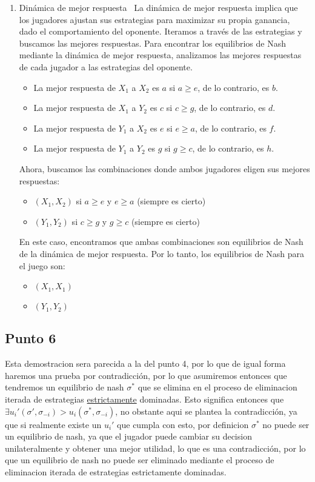 \documentclass[11pt]{article}
\begin{document}
\begin{enumerate}
    \item Dinámica de mejor respuesta \
    La dinámica de mejor respuesta implica que los jugadores ajustan sus estrategias para maximizar su propia ganancia, dado el comportamiento del oponente. Iteramos a través de las estrategias y buscamos las mejores respuestas.
    Para encontrar los equilibrios de Nash mediante la dinámica de mejor respuesta, analizamos las mejores respuestas de cada jugador a las estrategias del oponente.
    \begin{itemize}
    \item La mejor respuesta de $X_1$ a $X_2$ es $a$ si $a \geq e$, de lo contrario, es $b$.
    \item La mejor respuesta de $X_1$ a $Y_2$ es $c$ si $c \geq g$, de lo contrario, es $d$.
    \item La mejor respuesta de $Y_1$ a $X_2$ es $e$ si $e \geq a$, de lo contrario, es $f$.
    \item La mejor respuesta de $Y_1$ a $Y_2$ es $g$ si $g \geq c$, de lo contrario, es $h$.
    \end{itemize}
    Ahora, buscamos las combinaciones donde ambos jugadores eligen sus mejores respuestas:
    \begin{itemize}
    \item $(X_1, X_2)$ si $a \geq e$ y $e \geq a$ (siempre es cierto)
    \item $(Y_1, Y_2)$ si $c \geq g$ y $g \geq c$ (siempre es cierto)
    \end{itemize}
    En este caso, encontramos que ambas combinaciones son equilibrios de Nash de la dinámica de mejor respuesta.
    Por lo tanto, los equilibrios de Nash para el juego son:
    \begin{itemize}
    \item $(X_1, X_1)$
    \item $(Y_1, Y_2)$
    \end{itemize}
    \end{enumerate}
\subsection{Punto 6}

\begin{flushleft}
    Esta demostracion sera parecida a la del punto 4, por lo que de igual forma haremos una prueba por contradicción, por lo que asumiremos entonces que tendremos
    un equilibrio de nash $\sigma^*$ que se elimina en el proceso de eliminacion iterada de estrategias \underline{estrictamente} dominadas. Esto significa entonces que
    $\exists u_i'(\sigma',\sigma_{-i})>u_i(\sigma^*,\sigma_{-i})$, no obstante aqui se plantea la contradicción, ya que si realmente existe un $u_i'$ que cumpla con esto,
    por definicion $\sigma^*$ no puede ser un equilibrio de nash, ya que el jugador puede cambiar su decision unilateralmente y obtener una mejor utilidad, lo que es una contradicción,
    por lo que un equilibrio de nash no puede ser eliminado mediante el proceso de eliminacion iterada de estrategias estrictamente dominadas. 
\end{flushleft}
\end{document}
